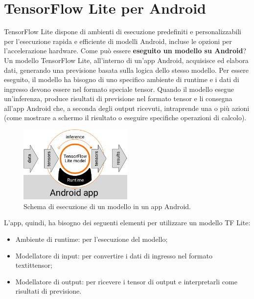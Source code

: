 \section{TensorFlow Lite per Android}
TensorFlow Lite dispone di ambienti di esecuzione predefiniti e personalizzabili per l’esecuzione rapida e efficiente di modelli Android, incluse le opzioni per l'accelerazione hardware.
Come può essere \textbf{eseguito un modello su Android}? Un modello TensorFlow Lite, all’interno di un’app Android, acquisisce ed elabora dati, generando una previsione basata sulla logica dello stesso modello.
Per essere eseguito, il modello ha bisogno di uno specifico ambiente di runtime e i dati di ingresso devono essere nel formato speciale tensor. Quando il modello esegue un’inferenza, produce risultati di
previsione nel formato tensor e li consegna all’app Android che, a seconda degli output ricevuti, intraprende una o più azioni (come mostrare a schermo il risultato o eseguire specifiche operazioni di calcolo).

\begin{figure}[ht]
    \centering
    \includegraphics[width=0.5\textwidth]{Immagini/esecuzione.png}
    \caption{Schema di esecuzione di un modello in un app Android.}
    \label{fig:esecuzione}
\end{figure}

L’app, quindi, ha bisogno dei seguenti elementi per utilizzare un modello TF Lite:
\begin{itemize}
    \item Ambiente di runtime: per l’esecuzione del modello;
    \item Modellatore di input: per convertire i dati di ingresso nel formato textit{tensor};
    \item Modellatore di output: per ricevere i tensor di output e interpretarli come risultati di previsione.
\end{itemize}

